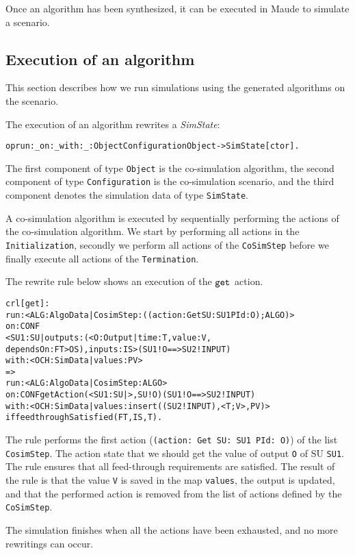 Once an algorithm has been synthesized, it can be executed in Maude to simulate a scenario.

\subsection{Execution of an algorithm}
This section describes how we run simulations using the generated algorithms on the scenario.

The execution of an algorithm rewrites a \emph{SimState}:
\small
\begin{alltt}
op run:_on:_with:_ : Object Configuration Object -> SimState [ctor]. 
\end{alltt}
\normalsize
The first component of type \texttt{Object} is the co-simulation algorithm, the second component of type \texttt{Configuration} is the co-simulation scenario, and the third component denotes the simulation data of type \texttt{SimState}.

A co-simulation algorithm is executed by sequentially performing the actions of the co-simulation algorithm.
We start by performing all actions in the \texttt{Initialization}, secondly we perform all actions of the \texttt{CoSimStep} before we finally execute all actions of the \texttt{Termination}. 

The rewrite rule below shows an execution of the $\mathtt{get}_{}$ action.
\small
\begin{alltt}
crl [get] : 
run: < ALG : AlgoData | CosimStep : ((action: Get SU: SU1 PId: O) ; ALGO) >
on: CONF
< SU1 : SU | outputs : (< O : Output | time : T, value : V, 
  dependsOn : FT > OS), inputs : IS > ( SU1 ! O ==> SU2 ! INPUT)
with: < OCH : SimData | values : PV >
=> 
run: < ALG : AlgoData | CosimStep : ALGO >
on: CONF getAction(< SU1 : SU | >, SU ! O) ( SU1 ! O ==> SU2 ! INPUT)
with: < OCH : SimData | values : insert((SU2 ! INPUT), < T ; V >, PV) > 
if feedthroughSatisfied(FT, IS, T) .
\end{alltt}
\normalsize
The rule performs the first action (\texttt{(action: Get SU: SU1 PId: O)}) of the list \texttt{CosimStep}.
The action state that we should get the value of output \texttt{O} of SU \texttt{SU1}.
The rule ensures that all feed-through requirements are satisfied.
The result of the rule is that the value \texttt{V} is saved in the map \texttt{values}, the output is updated, and that the performed action is removed from the list of actions defined by the \texttt{CoSimStep}.

The simulation finishes when all the actions have been exhausted, and no more rewritings can occur.

